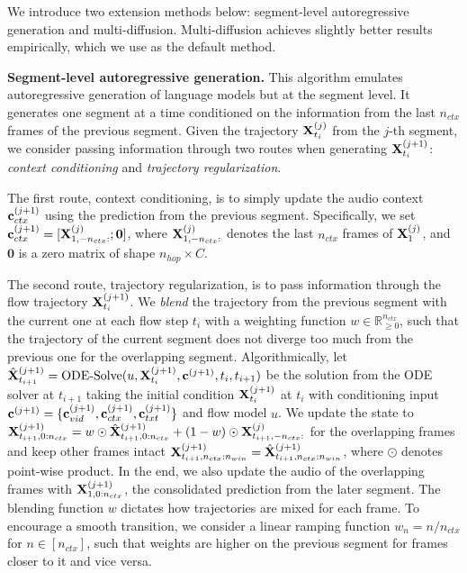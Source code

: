We introduce two extension methods below: segment-level autoregressive generation and multi-diffusion. Multi-diffusion achieves slightly better results empirically, which we use as the default method.

\textbf{Segment-level autoregressive generation.}
This algorithm emulates autoregressive generation of language models but at the segment level.
It generates one segment at a time conditioned on the information from the last $n_{ctx}$ frames of the previous segment.
Given the trajectory $\mathbf{X}_{t_i}^{(j)}$ from the $j$-th segment,
we consider passing information through two routes when generating $\mathbf{X}_{t_i}^{(j+1)}$: \textit{context conditioning} and \textit{trajectory regularization}.

The first route, context conditioning, is to simply update the audio context $\mathbf{c}_{ctx}^{(j+1)}$ using the prediction from the previous segment.
Specifically, we set $\mathbf{c}_{ctx}^{(j+1)} = [\mathbf{X}_{1,-n_{ctx}:}^{(j)}; \mathbf{0}]$,
where $\mathbf{X}_{1,-n_{ctx}:}^{(j)}$ denotes the last $n_{ctx}$ frames of $\mathbf{X}_1^{(j)}$, and $\mathbf{0}$ is a zero matrix of shape $n_{hop} \times C$.

The second route, trajectory regularization, is to pass information through the flow trajectory $\mathbf{X}_{t_i}^{(j+1)}$.
We \textit{blend} the trajectory from the previous segment with the current one at each flow step $t_i$ with a weighting function $w \in \mathbb{R}_{\ge 0}^{n_{ctx}}$,
such that the trajectory of the current segment does not diverge too much from the previous one for the overlapping segment.
Algorithmically, let $\hat{\mathbf{X}}_{t_{i+1}}^{(j+1)} = \text{ODE-Solve}(u, \mathbf{X}_{t_i}^{(j+1)}, \mathbf{c}^{(j+1)}, t_i, t_{i+1})$ be the solution from the ODE solver at $t_{i+1}$ taking the initial condition $\mathbf{X}_{t_i}^{(j+1)}$ at $t_i$ with conditioning input $\mathbf{c}^{(j+1)} = \{\mathbf{c}_{vid}^{(j+1)}, \mathbf{c}_{ctx}^{(j+1)}, \mathbf{c}_{txt}^{(j+1)}\}$ and flow model $u$.
We update the state to $\mathbf{X}_{t_{i+1},0:n_{ctx}}^{(j+1)} = w \odot \hat{\mathbf{X}}_{t_{i+1},0:n_{ctx}}^{(j+1)} + (1-w) \odot \mathbf{X}_{t_{i+1},-n_{ctx}:}^{(j)}$ for the overlapping frames and keep other frames intact $\mathbf{X}_{t_{i+1},n_{ctx}:n_{win}}^{(j+1)} = \hat{\mathbf{X}}_{t_{i+1},n_{ctx}:n_{win}}^{(j+1)}$,
where $\odot$ denotes point-wise product.
In the end, we also update the audio of the overlapping frames with $\mathbf{X}_{1,0:n_{ctx}}^{(j+1)}$, the consolidated prediction from the later segment.
The blending function $w$ dictates how trajectories are mixed for each frame.
To encourage a smooth transition,
we consider a linear ramping function $w_n = n / n_{ctx}$ for $n \in [n_{ctx}]$,
such that weights are higher on the previous segment for frames closer to it and vice versa.

